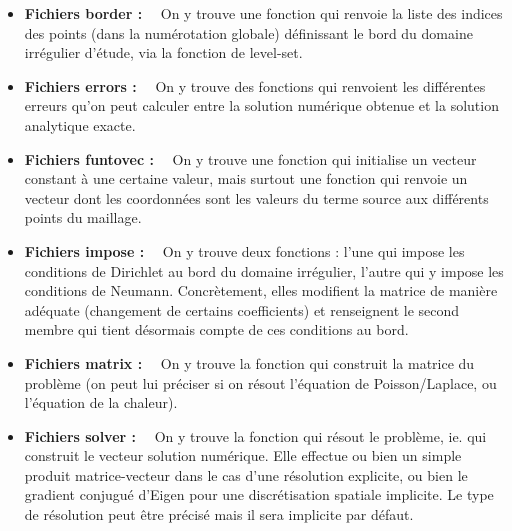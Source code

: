 \documentclass[12pt]{article}
\begin{document}
\noindent
\begin{itemize}
	\item \textbf{Fichiers border :}~~ On y trouve une fonction qui renvoie la liste des indices des points (dans la numérotation globale) définissant le bord du domaine irrégulier d'étude, via la fonction de level-set.

\vspace{5 mm}

	\item \textbf{Fichiers errors :}~~ On y trouve des fonctions qui renvoient les différentes erreurs qu'on peut calculer entre la solution numérique obtenue et la solution analytique exacte.
	
\vspace{5 mm}
	
	\item \textbf{Fichiers funtovec :}~~ On y trouve une fonction qui initialise un vecteur constant à une certaine valeur, mais surtout une fonction qui renvoie un vecteur dont les coordonnées sont les valeurs du terme source aux différents points du maillage.

\vspace{5 mm}

	\item \textbf{Fichiers impose :}~~ On y trouve deux fonctions : l'une qui impose les conditions de Dirichlet au bord du domaine irrégulier, l'autre qui y impose les conditions de Neumann. Concrètement, elles modifient la matrice de manière adéquate (changement de certains coefficients) et renseignent le second membre qui tient désormais compte de ces conditions au bord.

\vspace{5 mm}

	\item \textbf{Fichiers matrix :}~~ On y trouve la fonction qui construit la matrice du problème (on peut lui préciser si on résout l'équation de Poisson/Laplace, ou l'équation de la chaleur).
	
\vspace{5 mm}
	
	\item \textbf{Fichiers solver :}~~ On y trouve la fonction qui résout le problème, ie. qui construit le vecteur solution numérique. Elle effectue ou bien un simple produit matrice-vecteur dans le cas d'une résolution explicite, ou bien le gradient conjugué d'Eigen pour une discrétisation spatiale implicite. Le type de résolution peut être précisé mais il sera implicite par défaut.
\end{itemize}
\end{document}
